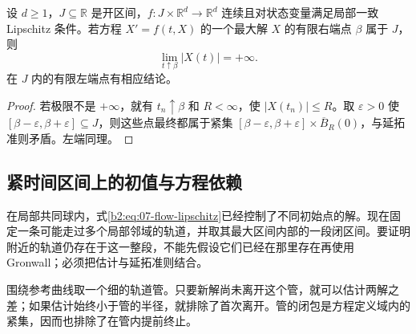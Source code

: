 \begin{corollary}[全空间中的爆破判据]\label{b2:cor:ode-blowup-alternative}
设 \(d\geq1\)，\(J\subseteq\mathbb R\) 是开区间，\(f\colon J\times\mathbb R^d\to\mathbb R^d\) 连续且对状态变量满足局部一致 Lipschitz 条件。若方程 \(X'=f(t,X)\) 的一个最大解 \(X\) 的有限右端点 \(\beta\) 属于 \(J\)，则
\[
 \lim_{t\uparrow\beta}|X(t)|=+\infty.
\]
在 \(J\) 内的有限左端点有相应结论。
\end{corollary}
\begin{proof}
若极限不是 \(+\infty\)，就有 \(t_n\uparrow\beta\) 和 \(R<\infty\)，使 \(|X(t_n)|\leq R\)。取 \(\varepsilon>0\) 使 \([\beta-\varepsilon,\beta+\varepsilon]\subseteq J\)，则这些点最终都属于紧集 \([\beta-\varepsilon,\beta+\varepsilon]\times\overline B_R(0)\)，与延拓准则矛盾。左端同理。
\end{proof}

\subsection{紧时间区间上的初值与方程依赖}
\label{b2:subsec:ode-initial-dependence}

在局部共同球内，式\eqref{b2:eq:07-flow-lipschitz}已经控制了不同初始点的解。现在固定一条可能走过多个局部邻域的轨道，并取其最大区间内部的一段闭区间。要证明附近的轨道仍存在于这一整段，不能先假设它们已经在那里存在再使用 Gronwall；必须把估计与延拓准则结合。

\ProseParagraphBreak
围绕参考曲线取一个细的轨道管。只要新解尚未离开这个管，就可以估计两解之差；如果估计始终小于管的半径，就排除了首次离开。管的闭包是方程定义域内的紧集，因而也排除了在管内提前终止。

